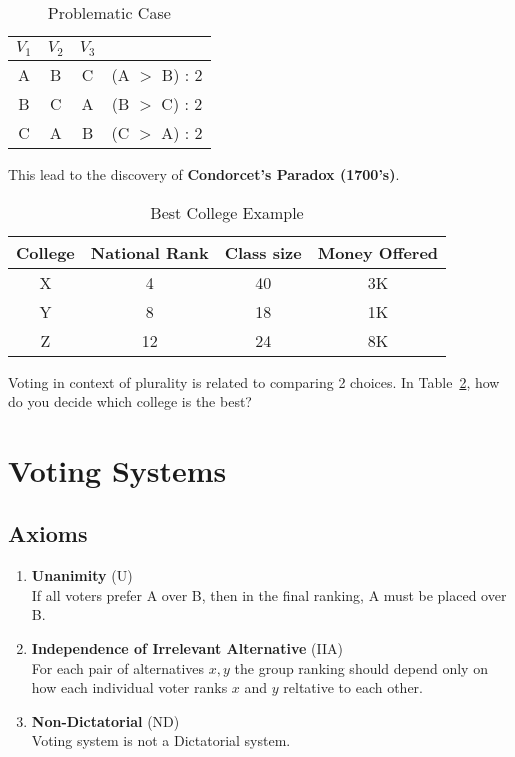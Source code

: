 \documentclass[twoside]{article}
\begin{document}
\begin{table}[H]
    \centering
     \begin{tabular}{ccc|c}
     $V_1$ & $V_2$ & $V_3$ &  \\ \hline
     A & B & C & (A $>$ B) : 2 \\
     B & C & A & (B $>$ C) : 2 \\
     C & A & B & (C $>$ A) : 2 
    \end{tabular}
    \caption{Problematic Case}
    \label{tab:ex2}
\end{table}

This lead to the discovery of \textbf{Condorcet's Paradox (1700's)}.

\begin{table}[H]
    \centering
     \begin{tabular}{c|c|c|c}
     College & National Rank & Class size & Money Offered  \\ \hline
     X & 4 & 40 & 3K \\
     Y & 8 & 18 & 1K \\
     Z & 12 & 24 & 8K 
    \end{tabular}
    \caption{Best College Example}
    \label{tab:ex3}
\end{table}

Voting in context of plurality is related to comparing 2 choices.  In Table~\ref{tab:ex3}, how do you decide which college is the best?

\section{Voting Systems}

\subsection{Axioms}

\begin{enumerate}
    \item \textbf{Unanimity} (U) \\
    If all voters prefer A over B, then in the final ranking, A must be placed over B.
    \item \textbf{Independence of Irrelevant Alternative} (IIA) \\
    For each pair of alternatives $x,y$ the group ranking should depend only on how each individual voter ranks $x$ and $y$ reltative to each other.
    \item \textbf{Non-Dictatorial} (ND) \\
    Voting system is not a Dictatorial system.
\end{enumerate}
\end{document}
